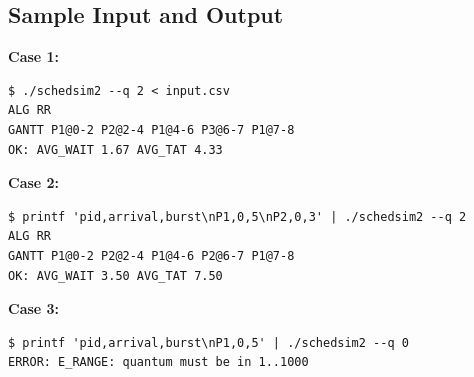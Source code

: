 \subsection{Sample Input and Output}

\textbf{Case 1:}
\begin{verbatim}
$ ./schedsim2 --q 2 < input.csv
ALG RR
GANTT P1@0-2 P2@2-4 P1@4-6 P3@6-7 P1@7-8
OK: AVG_WAIT 1.67 AVG_TAT 4.33
\end{verbatim}

\textbf{Case 2:}
\begin{verbatim}
$ printf 'pid,arrival,burst\nP1,0,5\nP2,0,3' | ./schedsim2 --q 2
ALG RR
GANTT P1@0-2 P2@2-4 P1@4-6 P2@6-7 P1@7-8
OK: AVG_WAIT 3.50 AVG_TAT 7.50
\end{verbatim}

\textbf{Case 3:}
\begin{verbatim}
$ printf 'pid,arrival,burst\nP1,0,5' | ./schedsim2 --q 0
ERROR: E_RANGE: quantum must be in 1..1000
\end{verbatim}